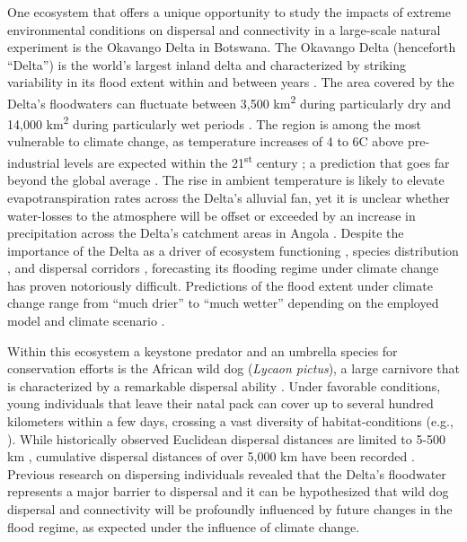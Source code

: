 \documentclass[abstract=on,10pt,a4paper,bibliography=totocnumbered]{article}
\begin{document}
One ecosystem that offers a unique opportunity to study the impacts of extreme
environmental conditions on dispersal and connectivity in a large-scale natural
experiment is the Okavango Delta in Botswana. The Okavango Delta (henceforth
``Delta'') is the world's largest inland delta and characterized by striking
variability in its flood extent within and between years \citep{Gumbricht.2004,
Wolski.2017}. The area covered by the Delta's floodwaters can fluctuate between
3,500 km\textsuperscript{2} during particularly dry and 14,000
km\textsuperscript{2} during particularly wet periods \citep{McCarthy.2003,
Gumbricht.2004}. The region is among the most vulnerable to climate change, as
temperature increases of 4 to 6\degree C above pre-industrial levels are
expected within the 21\textsuperscript{st} century \citep{Engelbrecht.2015,
Akinyemi.2019}; a prediction that goes far beyond the global average
\citep{IPCC.2022}. The rise in ambient temperature is likely to elevate
evapotranspiration rates across the Delta's alluvial fan, yet it is unclear
whether water-losses to the atmosphere will be offset or exceeded by an increase
in precipitation across the Delta's catchment areas in Angola
\citep{Wolski.2008, IPCC.2022}. Despite the importance of the Delta as a driver
of ecosystem functioning \citep{Wolski.2008}, species distribution
\citep{Bonyongo.2005, Bennitt.2014}, and dispersal corridors
\citep{Hofmann.2021, Hofmann.2023}, forecasting its flooding regime under
climate change has proven notoriously difficult. Predictions of the flood extent
under climate change range from ``much drier'' to ``much wetter'' depending on
the employed model and climate scenario \citep{Murray-Hudson.2006, Wolski.2008}.

Within this ecosystem a keystone predator and an umbrella species for
conservation efforts is the African wild dog (\textit{Lycaon pictus}), a large
carnivore that is characterized by a remarkable dispersal ability
\citep{McNutt.1996, Davies-Mostert.2012, Masenga.2016, Cozzi.2020,
Sandoval-Seres.2022}. Under favorable conditions, young individuals that leave
their natal pack can cover up to several hundred kilometers within a few days,
crossing a vast diversity of habitat-conditions (e.g., \citealp{Cozzi.2020}).
While historically observed Euclidean dispersal distances are limited to 5-500
km \citep{Davies-Mostert.2012, Cozzi.2020, Sandoval-Seres.2022}, cumulative
dispersal distances of over 5,000 km have been recorded \citep{Masenga.2016}.
Previous research on dispersing individuals revealed that the Delta's
floodwater represents a major barrier to dispersal \citep{Hofmann.2021,
Hofmann.2023} and it can be hypothesized that wild dog dispersal and
connectivity will be profoundly influenced by future changes in the flood
regime, as expected under the influence of climate change.
\end{document}
